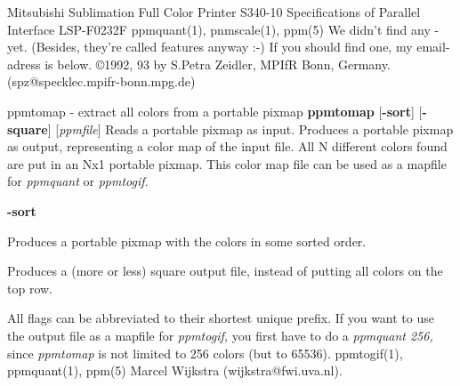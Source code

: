 Mitsubishi Sublimation Full Color Printer S340-10 Specifications of
Parallel Interface LSP-F0232F
ppmquant(1), pnmscale(1), ppm(5)
We didn't find any - yet. (Besides, they're called features anyway :-)
If you should find one, my email-adress is below.
\copyright 1992, 93 by S.Petra Zeidler, MPIfR Bonn, Germany.
(spz@specklec.mpifr-bonn.mpg.de)
%

%

\newpage
%

ppmtomap - extract all colors from a portable pixmap
{\bf ppmtomap}
{\rm [}{\bf -sort}{\rm ]}
{\rm [}{\bf -square}{\rm ]}
{\rm [}{\it ppmfile}{\rm ]}
Reads a portable pixmap as input.
Produces a portable pixmap as output, representing a color map of the
input file. All N different colors found are put in an Nx1 portable
pixmap.
This color map file can be used as a mapfile for
{\it ppmquant}
or
{\it ppmtogif.}
\begin{TPlist}{{\bf -sort}}
\item[{{\bf -sort}}]
Produces a portable pixmap with the colors in some sorted order.
\item[{{\bf -square}}]
Produces a (more or less) square output file, instead of putting all
colors on the top row.
\end{TPlist}

\par
All flags can be abbreviated to their shortest unique prefix.
If you want to use the output file as a mapfile for
{\it ppmtogif,}
you first have to do a
{\it ppmquant 256,}
since
{\it ppmtomap}
is not limited to 256 colors (but to 65536).
ppmtogif(1), ppmquant(1), ppm(5)
Marcel Wijkstra (wijkstra@fwi.uva.nl).

